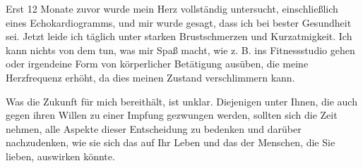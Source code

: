 Erst 12 Monate zuvor wurde mein Herz vollständig untersucht, einschließlich
eines Echokardiogramms, und mir wurde gesagt, dass ich bei bester Gesundheit
sei. Jetzt leide ich täglich unter starken Brustschmerzen und Kurzatmigkeit. Ich
kann nichts von dem tun, was mir Spaß macht, wie z. B. ins Fitnessstudio gehen
oder irgendeine Form von körperlicher Betätigung ausüben, die meine Herzfrequenz
erhöht, da dies meinen Zustand verschlimmern kann.

Was die Zukunft für mich bereithält, ist unklar. Diejenigen unter Ihnen, die
auch gegen ihren Willen zu einer Impfung gezwungen werden, sollten sich die Zeit
nehmen, alle Aspekte dieser Entscheidung zu bedenken und darüber nachzudenken,
wie sie sich das auf Ihr Leben und das der Menschen, die Sie lieben, auswirken
könnte.
